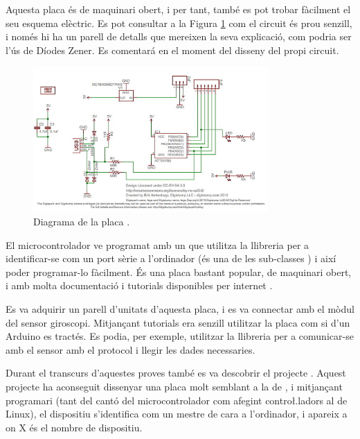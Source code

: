 Aquesta placa és de maquinari obert, i per tant, també es pot trobar fàcilment
el seu esquema elèctric. Es pot consultar a la Figura \ref{fig:digisparksch}
com el circuit és prou senzill, i només hi ha un parell de detalls que mereixen
la seva explicació, com podria ser l'ús de Díodes Zener. Es comentará en el
moment del disseny del propi circuit.

\begin{figure}[ht]
    \centering
    \includegraphics[width=0.8\textwidth]{images/modules/digisparksch.jpg}
    \caption{Diagrama de la placa  \cite{Digispark}.}
    \label{fig:digisparksch}
\end{figure}

El microcontrolador ve programat amb un  que utilitza la
llibreria  per a identificar-se com un port sèrie a l'ordinador
(és una de les sub-classes ) i així poder programar-lo fàcilment.
És una placa bastant popular, de maquinari obert, i amb molta documentació i
tutorials disponibles per internet \cite{DigisparkBootloader}.

Es va adquirir un parell d'unitats d'aquesta placa, i es va connectar amb el
mòdul del sensor giroscopi. Mitjançant tutorials era senzill utilitzar la
placa  com si d'un Arduino es tractés. Es podia, per exemple,
utilitzar la llibreria  per a comunicar-se amb el sensor amb el
protocol  i llegir les dades necessaries.

Durant el transcurs d'aquestes proves també es va descobrir el projecte
 \cite{I2cTinyUsb}. Aquest projecte ha aconseguit dissenyar una placa
molt semblant a la de , i mitjançant programari (tant del cantó
del microcontrolador com afegint contro\l.ladors al  de Linux),
el dispositiu s'identifica com un mestre  de cara a l'ordinador, i
apareix a  on X és el nombre de dispositiu.

